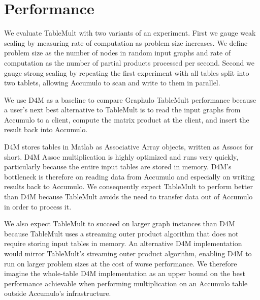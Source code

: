 
\section{Performance}
\label{sPerformance}

We evaluate TableMult with two variants of an experiment. 
First we gauge weak scaling by measuring rate of computation as problem size increases.
We define problem size as the number of nodes in random input graphs
and rate of computation as the number of partial products processed per second.
Second we gauge strong scaling by repeating the first experiment with all tables split into two tablets,
allowing Accumulo to scan and write to them in parallel.



We use D4M as a baseline to compare Graphulo TableMult performance because 
a user's next best alternative to TableMult is to read the input graphs from Accumulo to a client, 
compute the matrix product at the client, and insert the result back into Accumulo.

D4M stores tables in Matlab as Associative Array objects, written as Assocs for short.  
D4M Assoc multiplication is highly optimized and runs very quickly, 
particularly because the entire input tables are stored in memory. 
D4M's bottleneck is therefore on reading data from Accumulo and especially on writing results back to Accumulo.
We consequently expect TableMult to perform better than D4M 
because TableMult avoids the need to transfer data out of Accumulo in order to process it. 

We also expect TableMult to succeed on larger graph instances than D4M because TableMult
uses a streaming outer product algorithm that does not require storing input tables in memory.
An alternative D4M implementation would mirror TableMult's streaming outer product algorithm,
enabling D4M to run on larger problem sizes at the cost of worse performance.
We therefore imagine the whole-table D4M implementation as an upper bound on the best performance 
achievable when performing multiplication on an Accumulo table outside Accumulo's infrastructure.

